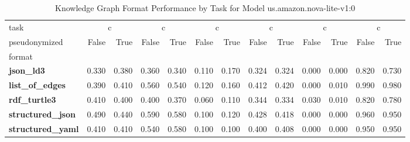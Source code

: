 \begin{table}
\caption{Knowledge Graph Format Performance by Task for Model us.amazon.nova-lite-v1:0}
\label{tab:results_us.amazon.nova-lite-v1:0}
\begin{tabular}{lrrrrrrrrrrrr}
\toprule
task & \multicolumn{2}{c}{c}{AggByRelation} & \multicolumn{2}{c}{c}{AggNeighborProperties} & \multicolumn{2}{c}{c}{HighestDegreeNode} & \multicolumn{2}{c}{c}{Overall} & \multicolumn{2}{c}{c}{ShortestPath} & \multicolumn{2}{c}{c}{TripleRetrieval} \\
pseudonymized & False & True & False & True & False & True & False & True & False & True & False & True \\
format &  &  &  &  &  &  &  &  &  &  &  &  \\
\midrule
\textbf{json_ld3} & 0.330 & 0.380 & 0.360 & 0.340 & 0.110 & 0.170 & 0.324 & 0.324 & 0.000 & 0.000 & 0.820 & 0.730 \\
\textbf{list_of_edges} & 0.390 & 0.410 & 0.560 & 0.540 & 0.120 & 0.160 & 0.412 & 0.420 & 0.000 & 0.010 & 0.990 & 0.980 \\
\textbf{rdf_turtle3} & 0.410 & 0.400 & 0.400 & 0.370 & 0.060 & 0.110 & 0.344 & 0.334 & 0.030 & 0.010 & 0.820 & 0.780 \\
\textbf{structured_json} & 0.490 & 0.440 & 0.590 & 0.580 & 0.100 & 0.120 & 0.428 & 0.418 & 0.000 & 0.000 & 0.960 & 0.950 \\
\textbf{structured_yaml} & 0.410 & 0.410 & 0.540 & 0.580 & 0.100 & 0.100 & 0.400 & 0.408 & 0.000 & 0.000 & 0.950 & 0.950 \\
\bottomrule
\end{tabular}
\end{table}
